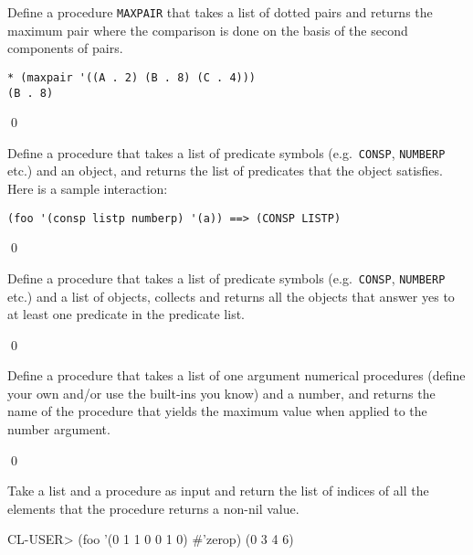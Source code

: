 \documentclass[a4paper,11pt]{article}
\begin{document}
\begin{uexercise}
Define a procedure \Verb+MAXPAIR+ that takes a list of dotted pairs and returns the maximum pair where the comparison is done on the basis of the second components of pairs. 

\begin{ucodeframe}
\begin{Verbatim}
* (maxpair '((A . 2) (B . 8) (C . 4)))
(B . 8)
\end{Verbatim}
\end{ucodeframe}

\qed
\end{uexercise}

\begin{uexercise}
Define a procedure that takes a list of predicate symbols (e.g.\ \Verb+CONSP+, \Verb+NUMBERP+ etc.) and an object, and returns the list of predicates that the object satisfies. Here is a sample interaction:

\begin{ucodeframe}
\begin{Verbatim}
(foo '(consp listp numberp) '(a)) ==> (CONSP LISTP)
\end{Verbatim}
\end{ucodeframe}

\qed
\end{uexercise}

\begin{uexercise}
Define a procedure that takes a list of predicate symbols (e.g.\ \Verb+CONSP+, \Verb+NUMBERP+ etc.) and a list of objects, collects and returns all the objects that answer yes to at least one predicate in the predicate list.

\qed
\end{uexercise}

\begin{uexercise}
Define a procedure that takes a list of one argument numerical procedures (define your own and/or use the built-ins you know) and a number, and returns the name of the procedure that yields the maximum value when applied to the number argument.

\qed
\end{uexercise}

\begin{uexercise}[*]

Take a list and a procedure as input and return the list of indices of all the
elements that the procedure returns a non-nil value. 

\begin{lispcode}
CL-USER> (foo '(0 1 1 0 0 1 0) #'zerop)
(0 3 4 6)
\end{lispcode}

\end{uexercise}
\end{document}
